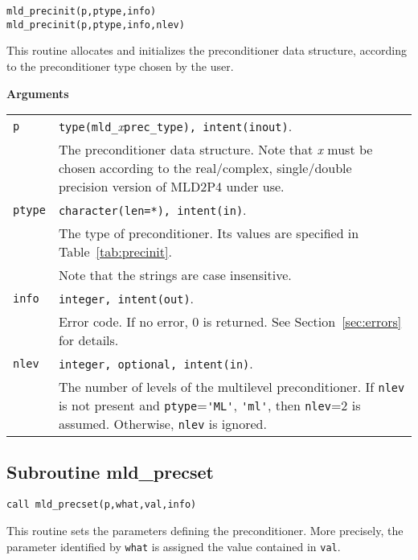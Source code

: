 \begin{center}
\verb|mld_precinit(p,ptype,info)| \\
\verb|mld_precinit(p,ptype,info,nlev)| \\
\end{center}

\noindent
This routine allocates and initializes the preconditioner data structure,
according to the preconditioner type chosen by the user.

{\baselineskip\noindent\large\bfseries Arguments}

\begin{tabular}{p{1.2cm}p{12cm}}
\verb|p|      & \verb|type(mld_|\emph{x}\verb|prec_type), intent(inout)|.\\
              & The preconditioner data structure. Note that \emph{x}
                must be chosen according to the real/complex, single/double
                precision version of MLD2P4 under use.\\
\verb|ptype|  & \verb|character(len=*), intent(in)|.\\
              & The type of preconditioner. Its values are specified
              in Table~\ref{tab:precinit}.\\
              & Note that the strings are case insensitive.\\
\verb|info|   & \verb|integer, intent(out)|.\\
              & Error code. If no error, 0 is returned. See Section~\ref{sec:errors} for details.\\
\verb|nlev|   & \verb|integer, optional, intent(in)|.\\
              & The number of levels of the multilevel preconditioner.
                If \verb|nlev| is not present and \verb|ptype|=\verb|'ML'|, \verb|'ml'|, 
                then \verb|nlev|=2 is assumed. Otherwise, \verb|nlev| is ignored.\\
\end{tabular}

\clearpage

\subsection{Subroutine mld\_precset\label{sec:precset}}

\begin{center}
\verb|call mld_precset(p,what,val,info)|
\end{center}

\noindent
This routine sets the parameters defining the preconditioner. More
precisely, the parameter identified by \verb|what| is assigned the value
contained in \verb|val|. 

